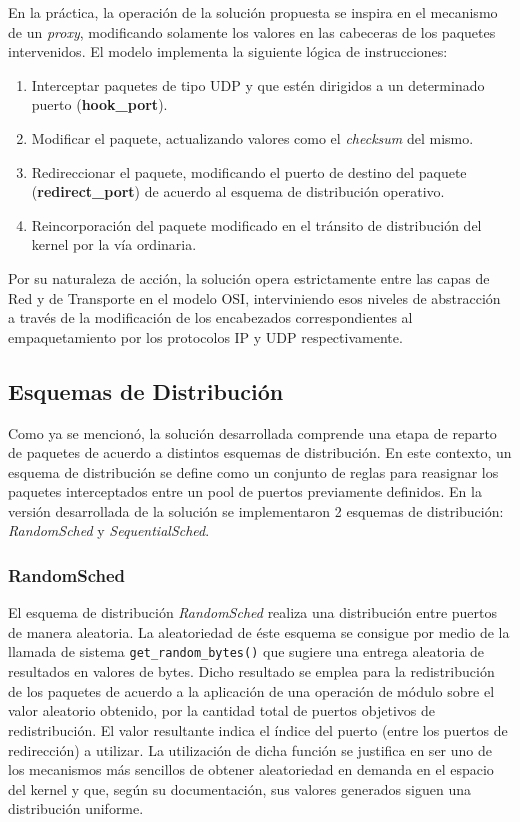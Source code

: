 En la práctica, la operación de la solución propuesta se inspira en el mecanismo de un \emph{proxy}, modificando solamente los valores en las cabeceras de los paquetes intervenidos. El modelo implementa la siguiente lógica de instrucciones:

\begin{enumerate}
\item Interceptar paquetes de tipo UDP y que estén dirigidos a un determinado puerto (\textbf{hook\_port}).
\item Modificar el paquete, actualizando valores como el \emph{checksum} del mismo.
\item Redireccionar el paquete, modificando el puerto de destino del paquete (\textbf{redirect\_port}) de acuerdo al esquema de distribución operativo.
\item Reincorporación del paquete modificado en el tránsito de distribución del kernel por la vía ordinaria.
\end{enumerate}

Por su naturaleza de acción, la solución opera estrictamente entre las capas de Red y de Transporte en el modelo OSI, interviniendo esos niveles de abstracción a través de la modificación de los encabezados correspondientes al empaquetamiento por los protocolos IP y UDP respectivamente.


\subsection{Esquemas de Distribución}
Como ya se mencionó, la solución desarrollada comprende una etapa de reparto de paquetes de acuerdo a distintos esquemas de distribución. En este contexto, un esquema de distribución se define como un conjunto de reglas para reasignar los paquetes interceptados entre un pool de puertos previamente definidos. En la versión desarrollada de la solución se implementaron 2 esquemas de distribución: \emph{RandomSched} y \emph{SequentialSched}.

\subsubsection{RandomSched}
El esquema de distribución \emph{RandomSched} realiza una distribución entre puertos de manera aleatoria. La aleatoriedad de éste esquema se consigue por medio de la llamada de sistema \verb=get_random_bytes()= que sugiere una entrega aleatoria de resultados en valores de bytes. Dicho resultado se emplea para la redistribución de los paquetes de acuerdo a la aplicación de una operación de módulo sobre el valor aleatorio obtenido, por la cantidad total de puertos objetivos de redistribución. El valor resultante indica el índice del puerto (entre los puertos de redirección) a utilizar. La utilización de dicha función se justifica en ser uno de los mecanismos más sencillos de obtener aleatoriedad en demanda en el espacio del kernel y que, según su documentación, sus valores generados siguen una distribución uniforme.


